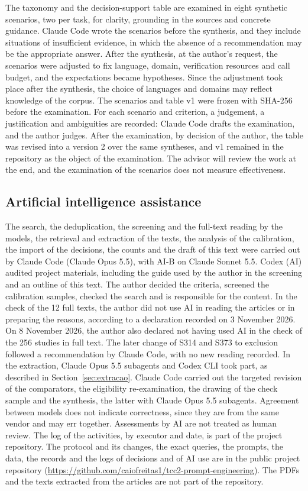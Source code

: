 The taxonomy and the decision-support table are examined in eight synthetic scenarios, two per task, for clarity,
grounding in the sources and concrete guidance. Claude Code wrote the scenarios before the synthesis, and they include
situations of insufficient evidence, in which the absence of a recommendation may be the appropriate answer. After the
synthesis, at the author's request, the scenarios were adjusted to fix language, domain, verification resources and
call budget, and the expectations became hypotheses. Since the adjustment took place after the synthesis, the
choice of languages and domains may reflect knowledge of the corpus. The scenarios and table v1 were
frozen with SHA-256 before the examination. For each scenario and criterion, a
judgement, a justification and ambiguities are recorded: Claude Code drafts the examination, and the author judges. After the examination, by decision
of the author, the table was revised into a version 2 over the same syntheses, and v1 remained in the repository as the object of the
examination. The advisor will review the work at the end, and the examination of the scenarios does not measure effectiveness.

\subsection{Artificial intelligence assistance}\label{sec:ia}
The search, the deduplication, the screening and the full-text reading by the models, the retrieval and extraction of the
texts, the analysis of the calibration, the import of the decisions, the counts and the draft of this text were
carried out by Claude Code (Claude Opus 5.5), with AI-B on Claude Sonnet 5.5. Codex (AI) audited
project materials, including the guide used by the author in the screening and an outline of this text. The author decided the
criteria, screened the calibration samples, checked the search and is responsible for the content. In the check of the 12 full
texts, the author did not use AI in reading the articles or in preparing the reasons, according to a declaration
recorded on 3 November 2026. On 8 November 2026, the author also declared not having used AI in the check of the 256 studies
in full text. The later change of S314 and S373 to exclusion followed a recommendation by Claude Code, with no new
reading recorded. In the extraction, Claude Opus 5.5 subagents and Codex CLI took part, as described in Section~\ref{sec:extracao}.
Claude Code carried out the targeted revision of the comparators, the eligibility re-examination, the drawing of the check
sample and the synthesis, the latter with Claude Opus 5.5 subagents. Agreement between models does not indicate correctness, since they are from the same vendor and may err
together. Assessments by AI are not treated as human review. The log of the activities, by executor and date, is
part of the project repository.
The protocol and its changes, the exact queries, the prompts, the data, the records and the logs of decisions and of
AI use are in the public project repository
(\url{https://github.com/caiofreitas1/tcc2-prompt-engineering}). The PDFs and the texts extracted from the articles are not
part of the repository.
